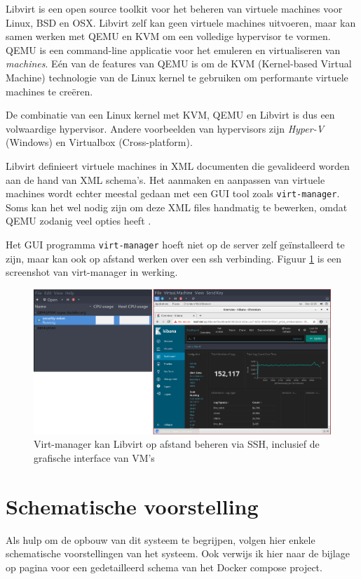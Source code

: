 \documentclass[a4paper,12pt]{report}
\begin{document}
Libvirt is een open source toolkit voor het beheren van virtuele machines voor Linux, BSD en OSX.
Libvirt zelf kan geen virtuele machines uitvoeren, maar kan samen werken met QEMU en KVM om een volledige hypervisor te vormen.
QEMU is een command-line applicatie voor het emuleren en virtualiseren van \emph{machines}.
Eén van de features van QEMU is om de KVM (Kernel-based Virtual Machine) technologie van de Linux kernel te gebruiken om performante virtuele machines te creëren.

De combinatie van een Linux kernel met KVM, QEMU en Libvirt is dus een volwaardige hypervisor.
Andere voorbeelden van hypervisors zijn \emph{Hyper-V} (Windows) en Virtualbox (Cross-platform).

Libvirt definieert virtuele machines in XML documenten die gevalideerd worden aan de hand van XML schema's.
Het aanmaken en aanpassen van virtuele machines wordt echter meestal gedaan met een GUI tool zoals \lstinline|virt-manager|.
Soms kan het wel nodig zijn om deze XML files handmatig te bewerken, omdat QEMU zodanig veel opties heeft \autocite{libvirt:docs}.

Het GUI programma \lstinline|virt-manager| hoeft niet op de server zelf geïnstalleerd te zijn, maar kan ook op afstand werken over een ssh verbinding.
Figuur \ref{fig:virt-manager} is een screenshot van virt-manager in werking.

\begin{figure}[H]
  \centering
  \includegraphics[width=\textwidth]{virt-manager}
  \caption{Virt-manager kan Libvirt op afstand beheren via SSH, inclusief de grafische interface van VM's}
  \label{fig:virt-manager}
\end{figure}

\section{Schematische voorstelling}
Als hulp om de opbouw van dit systeem te begrijpen, volgen hier enkele schematische voorstellingen van het systeem.
Ook verwijs ik hier naar de bijlage op pagina \pageref{bijlage:aangepast-systeem-schema-docker} voor een gedetailleerd schema van het Docker compose project.
\end{document}
